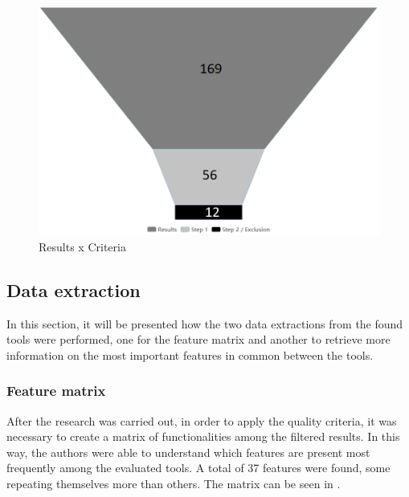 

\begin{figure}[htb]
  \caption{Results x Criteria}\label{fig:gl-results-criteria}
  \begin{center}
    \includegraphics[width=16cm]{img/gl-results.png}
  \end{center}
\end{figure}

\subsection{Data extraction}\label{sec:gl-data-extraction}

In this section, it will be presented how the two data extractions from the found tools were performed, one for the feature matrix and another to retrieve more information on the most important features in common between the tools.

\subsubsection{Feature matrix}\label{sec:gl-feature-matrix}

After the research was carried out, in order to apply the quality criteria, it was necessary to create a matrix of functionalities among the filtered results. In this way, the authors were able to understand which features are present most frequently among the evaluated tools. A total of 37 features were found, some repeating themselves more than others. The matrix can be seen in .

